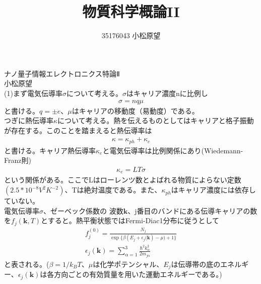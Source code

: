 \documentclass{jsarticle}
\title{物質科学概論II}
\author{35176043 小松原望 }
\begin{document}

ナノ量子情報エレクトロニクス特論Ⅱ\\
 \quad 小松原望\\
(1)まず電気伝導率$\sigma$について考える。$\sigma$はキャリア濃度nに比例し
\begin{eqnarray}
\sigma=nq\mu
\end{eqnarray}
と書ける。$q=\pm e$、$\mu$はキャリアの移動度（易動度）である。\\
\quad つぎに熱伝導率$\kappa$について考える。熱を伝えるものとしてはキャリアと格子振動が存在する。このことを踏まえると熱伝導率は
\begin{eqnarray}
\kappa=\kappa_{ph}+\kappa_{e}
\end{eqnarray}
と書ける。キャリア熱伝導率$\kappa_{e}$と電気伝導率は比例関係にあり(Wiedemann-Franz則)
\begin{eqnarray}
\kappa_{e}=LT\sigma
\end{eqnarray}
という関係がある。ここでLはローレンツ数とよばれる物質によらない定数$(2.5*10^{-8} V^2K^{-2})$、Tは絶対温度である。また、$\kappa_{ph}$はキャリア濃度には依存していない。\\
\quad 電気伝導率$\sigma$、ゼーベック係数の
波数$\bm{k}$、j番目のバンドにある伝導キャリアの数を$f_j(\bm{k},T)$とすると。熱平衡状態ではFermi-Diac1分布に従うとして
\begin{eqnarray}
f^{(0)}_j=\frac{N_j}{\exp\lbrace{\beta(E_j+\epsilon_j{(\bm k})-\mu)+1}\rbrace}\\
\epsilon_j(\bm k)=\sum_{\alpha=1}^3\frac{\hbar^2 k_\alpha^2}{2m_{j\alpha}}
\end{eqnarray}
と表される。($\beta=1/k_B T$、$\mu$は化学ポテンシャル、$E_j$は伝導帯の底のエネルギー、$\epsilon_j(\bm k)$は各方向ごとの有効質量を用いた運動エネルギーである。)
\end{document}
